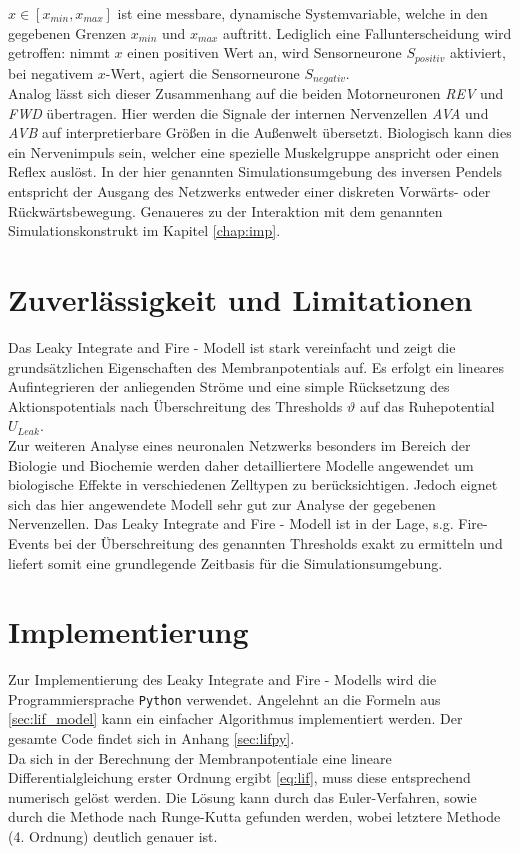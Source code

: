 	$x\in[x_{min}, x_{max}]$ ist eine messbare, dynamische Systemvariable, welche in den gegebenen Grenzen $x_{min} $ und $x_{max}$ auftritt. Lediglich eine Fallunterscheidung wird getroffen: nimmt $x$ einen positiven Wert an, wird Sensorneurone $S_{positiv}$ aktiviert, bei negativem $x$-Wert, agiert die Sensorneurone $S_{negativ}$.\\
	Analog lässt sich dieser Zusammenhang auf die beiden Motorneuronen \textit{REV} und \textit{FWD} übertragen. Hier werden die Signale der internen Nervenzellen \textit{AVA} und \textit{AVB} auf interpretierbare Größen in die Außenwelt übersetzt. Biologisch kann dies ein Nervenimpuls sein, welcher eine spezielle Muskelgruppe anspricht oder einen Reflex auslöst. In der hier genannten Simulationsumgebung des inversen Pendels entspricht der Ausgang des Netzwerks entweder einer diskreten Vorwärts- oder Rückwärtsbewegung. Genaueres zu der Interaktion mit dem genannten Simulationskonstrukt im Kapitel \ref{chap:imp}.

\section{Zuverlässigkeit und Limitationen}
\label{sec:lif_lim}
	Das Leaky Integrate and Fire - Modell ist stark vereinfacht und zeigt die grundsätzlichen Eigenschaften des Membranpotentials auf. Es erfolgt ein lineares Aufintegrieren der anliegenden Ströme und eine simple Rücksetzung des Aktionspotentials nach Überschreitung des Thresholds $\vartheta$ auf das Ruhepotential $U_{Leak}$.\\
	Zur weiteren Analyse eines neuronalen Netzwerks besonders im Bereich der Biologie und Biochemie werden daher detailliertere Modelle angewendet um biologische Effekte in verschiedenen Zelltypen zu berücksichtigen. Jedoch eignet sich das hier angewendete Modell sehr gut zur Analyse der gegebenen Nervenzellen. Das Leaky Integrate and Fire - Modell ist in der Lage, s.g. Fire-Events bei der Überschreitung des genannten Thresholds exakt zu ermitteln und liefert somit eine grundlegende Zeitbasis für die Simulationsumgebung.

\section{Implementierung}
\label{sec:lif_imp}
	Zur Implementierung des Leaky Integrate and Fire - Modells wird die Programmiersprache \texttt{Python} verwendet. Angelehnt an die Formeln aus \ref{sec:lif_model} kann ein einfacher Algorithmus implementiert werden. Der gesamte Code findet sich in Anhang \ref{sec:lifpy}.\\
	Da sich in der Berechnung der Membranpotentiale eine lineare Differentialgleichung erster Ordnung ergibt \ref{eq:lif}, muss diese entsprechend numerisch gelöst werden. Die Lösung kann durch das Euler-Verfahren, sowie durch die Methode nach Runge-Kutta gefunden werden, wobei letztere Methode (4. Ordnung) deutlich genauer ist.
	
